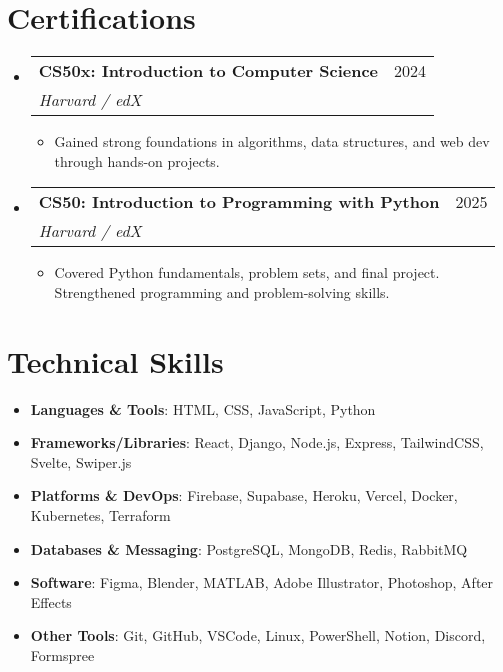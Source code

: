 \documentclass[letterpaper,11pt]{article}
\makeatletter
\newcommand{\resumeItem}[1]{
  \item\small{
    {#1 \vspace{-2pt}}
  }
}
\newcommand{\resumeSubheading}[4]{
  \vspace{-1pt}\item
    \begin{tabular*}{0.97\textwidth}[t]{l@{\extracolsep{\fill}}r}
      \textbf{#1} & #2 \\
      \textit{\small#3} & \textit{\small #4} \\
    \end{tabular*}\vspace{-5pt}
}
\newcommand{\resumeSubItem}[2]{\item\small{\textbf{#1}{: #2 \vspace{-2pt}}}}
\newcommand{\resumeSubHeadingListStart}{\begin{itemize}[leftmargin=*]}
\newcommand{\resumeSubHeadingListEnd}{\end{itemize}}
\newcommand{\resumeItemListStart}{\begin{itemize}}
\newcommand{\resumeItemListEnd}{\end{itemize}\vspace{-5pt}}
\makeatother
\begin{document}
\section{Certifications}
    \resumeSubHeadingListStart
        \resumeSubheading
            {CS50x: Introduction to Computer Science}{2024}
            {Harvard / edX}{}
            \resumeItemListStart
                \resumeItem{Gained strong foundations in algorithms, data structures, and web dev through hands-on projects.}
            \resumeItemListEnd
        \resumeSubheading
            {CS50: Introduction to Programming with Python}{2025}
            {Harvard / edX}{}
            \resumeItemListStart
                \resumeItem{Covered Python fundamentals, problem sets, and final project. Strengthened programming and problem-solving skills.}
            \resumeItemListEnd
    \resumeSubHeadingListEnd

\section{Technical Skills}
 \resumeSubHeadingListStart
    \resumeSubItem{Languages \& Tools}{HTML, CSS, JavaScript, Python}
    \resumeSubItem{Frameworks/Libraries}{React, Django, Node.js, Express, TailwindCSS, Svelte, Swiper.js}
    \resumeSubItem{Platforms \& DevOps}{Firebase, Supabase, Heroku, Vercel, Docker, Kubernetes, Terraform}
    \resumeSubItem{Databases \& Messaging}{PostgreSQL, MongoDB, Redis, RabbitMQ}
    \resumeSubItem{Software}{Figma, Blender, MATLAB, Adobe Illustrator, Photoshop, After Effects}
    \resumeSubItem{Other Tools}{Git, GitHub, VSCode, Linux, PowerShell, Notion, Discord, Formspree}
 \resumeSubHeadingListEnd
\end{document}
